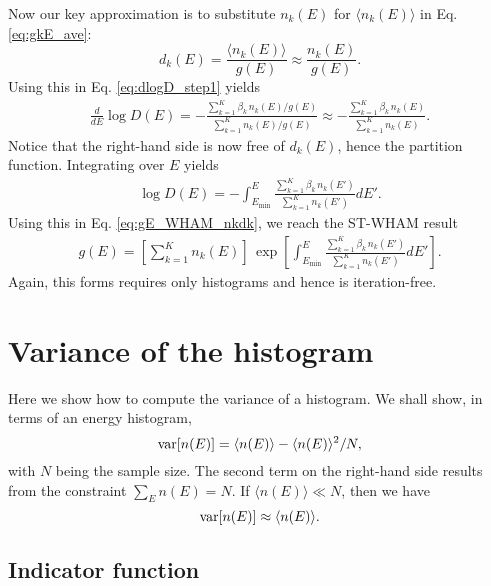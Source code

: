 \documentclass[aip,jcp,preprint,superscriptaddress]{revtex4-1}
\begin{document}
Now our key approximation
is to substitute $n_k(E)$ for $\langle n_k(E) \rangle$
in Eq. \eqref{eq:gkE_ave}:
%
\begin{equation}
  d_k(E)
  =
  \frac{ \langle n_k(E) \rangle } { g(E) }
  \approx
  \frac{ n_k(E) } { g(E) }.
  \label{eq:dkE_approx}
\end{equation}
%
Using this in Eq. \eqref{eq:dlogD_step1} yields
%
\begin{align*}
\frac{d}{dE} \log D(E)
=
-\frac{ \sum_{k = 1}^K \beta_k \, n_k(E) / g(E) }
{ \sum_{k = 1}^K n_k(E) / g(E) }
\approx
-\frac{ \sum_{k = 1}^K \beta_k \, n_k(E) }
{ \sum_{k = 1}^K n_k(E) }.
\end{align*}
%
Notice that the right-hand side
is now free of $d_k(E)$, hence the partition function.
%
Integrating over $E$ yields
%
\begin{align*}
\log D(E)
=
-\int^E_{E_{\min}} \frac{ \sum_{k = 1}^K \beta_k \, n_k(E') }
{ \sum_{k = 1}^K n_k(E') } dE'.
\end{align*}
%
Using this in Eq. \eqref{eq:gE_WHAM_nkdk},
we reach the ST-WHAM result
\begin{align}
g(E)
=
\left[
  \sum_{k = 1}^K n_k(E)
\right]
\,
\exp
\left[
\int^E_{E_{\min}}
    \frac{ \sum_{k = 1}^K \beta_k \, n_k(E') }
         { \sum_{k = 1}^K n_k(E') }
  dE'
\right].
\label{eq:g_STWHAM}
\end{align}
%
Again, this forms requires
only histograms
and hence is iteration-free.






\appendix



\section{\label{sec:varhist}
Variance of the histogram}



Here we show how to compute
the variance of a histogram.
%
We shall show,
in terms of an energy histogram,
\[
  \mathrm{var}[ n(E) ] = \langle n(E) \rangle -  \langle n(E) \rangle^2/N,
\]
with $N$ being the sample size.
%
The second term on the right-hand side
results from the constraint $\sum_E n(E) = N$.
%
If $\langle n(E) \rangle \ll N$,
then we have
\[
  \mathrm{var}[ n(E) ] \approx \langle n(E) \rangle.
\]



\subsection{Indicator function}
\end{document}
